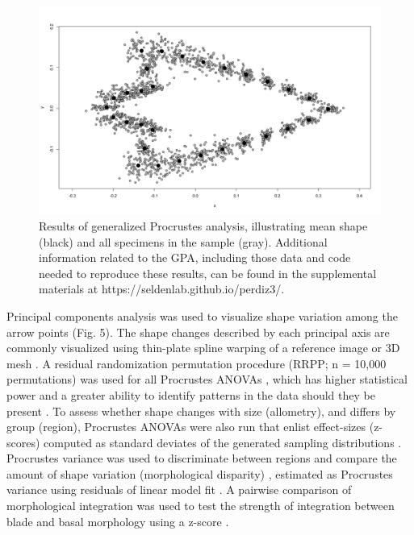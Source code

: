 \documentclass[smallextended]{svjour3}       %
\begin{document}
\begin{figure}
\includegraphics[width=1\linewidth]{ms-figs/figure3} \caption{Results of generalized Procrustes analysis, illustrating mean shape (black) and all specimens in the sample (gray). Additional information related to the GPA, including those data and code needed to reproduce these results, can be found in the supplemental materials at https://seldenlab.github.io/perdiz3/.}\label{fig:fig3}
\end{figure}

Principal components analysis \cite{RN8576} was used to visualize shape
variation among the arrow points (Fig. 5). The shape changes described
by each principal axis are commonly visualized using thin-plate spline
warping of a reference image or 3D mesh \cite{RN8555,RN8553}. A residual
randomization permutation procedure (RRPP; n = 10,000 permutations) was
used for all Procrustes ANOVAs \cite{RN8579,RN8334}, which has higher
statistical power and a greater ability to identify patterns in the data
should they be present \cite{RN6995}. To assess whether shape changes
with size (allometry), and differs by group (region), Procrustes ANOVAs
\cite{RN7046} were also run that enlist effect-sizes (z-scores) computed
as standard deviates of the generated sampling distributions
\cite{RN8477}. Procrustes variance was used to discriminate between
regions and compare the amount of shape variation (morphological
disparity) \cite{RN5703}, estimated as Procrustes variance using
residuals of linear model fit \cite{RN8314}. A pairwise comparison of
morphological integration was used to test the strength of integration
between blade and basal morphology using a z-score \cite{RN8340}.
\end{document}
